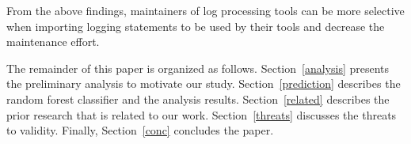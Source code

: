 From the above findings, maintainers of log processing tools can be more selective when importing logging statements to be used by their tools and decrease the maintenance effort.





%



 
 
 
The remainder of this paper is organized as follows. Section~\ref{analysis} presents the preliminary analysis to motivate our study. Section~\ref{prediction} describes the random forest classifier and the analysis results. Section~\ref{related} describes the prior research that is related to our work. Section~\ref{threats} discusses the threats to validity. Finally, Section~\ref{conc} concludes the paper.
 
 
